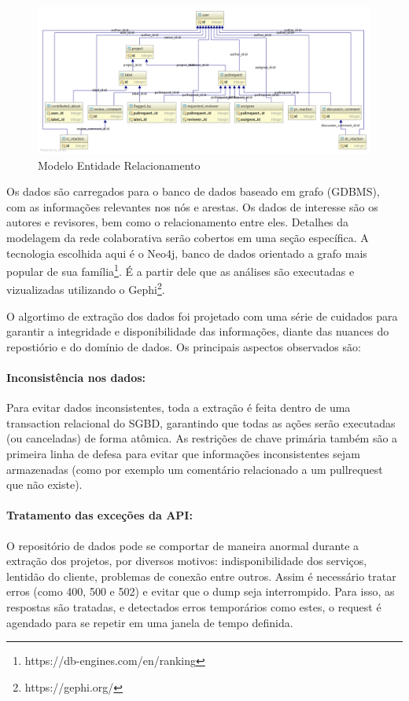\documentclass[a4paper,12pt]{monografia}
\theoremstyle{plain}
\theoremstyle{definition}
\theoremstyle{remark}
\begin{document}
\begin{figure}[!htbp]
 \includegraphics[width=\textwidth]{mer}
 \caption{Modelo Entidade Relacionamento}\label{fig:mer}
\end{figure}

Os dados são carregados para o banco de dados baseado em grafo (GDBMS), com as informações relevantes nos nós e arestas. Os dados de interesse são os autores e revisores, bem como o relacionamento entre eles. Detalhes da modelagem da rede colaborativa serão cobertos em uma seção específica. A tecnologia escolhida aqui é o Neo4j, banco de dados orientado a grafo mais popular de sua família\footnote{https://db-engines.com/en/ranking}. É a partir dele que as análises são executadas e vizualizadas utilizando o Gephi\footnote{https://gephi.org/}.

O algortimo de extração dos dados foi projetado com uma série de cuidados para garantir a integridade e disponibilidade das informações, diante das nuances do repostiório e do domínio de dados. Os principais aspectos observados são:

\paragraph{Inconsistência nos dados: } Para evitar dados inconsistentes, toda a extração é feita dentro de uma transaction relacional do SGBD, garantindo que todas as ações serão executadas (ou canceladas) de forma atômica. As restrições de chave primária também são a primeira linha de defesa para evitar que informações inconsistentes sejam armazenadas (como por exemplo um comentário relacionado a um pullrequest que não existe).

\paragraph{Tratamento das exceções da API: } O repositório de dados pode se comportar de maneira anormal durante a extração dos projetos, por diversos motivos: indisponibilidade dos serviços, lentidão do cliente, problemas de conexão entre outros. Assim é necessário tratar erros (como 400, 500 e 502) e evitar que o dump seja interrompido. Para isso, as respostas são tratadas, e detectados erros temporários como estes, o request é agendado para se repetir em uma janela de tempo definida.
\end{document}
